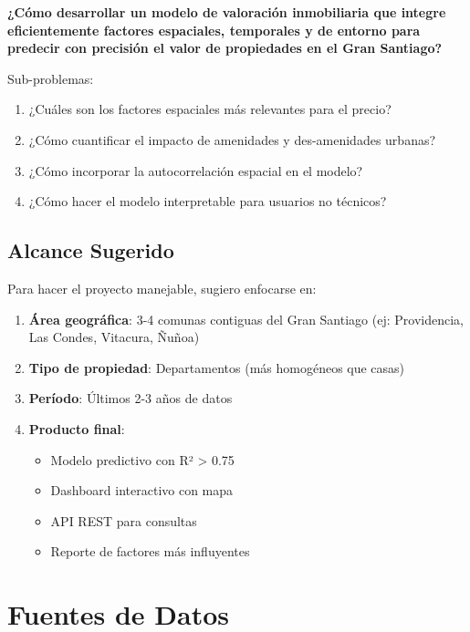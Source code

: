 \documentclass[11pt,a4paper]{article}
\begin{document}
\begin{tcolorbox}[colframe=usachred,colback=red!5,title=Problemática Central]
\textbf{¿Cómo desarrollar un modelo de valoración inmobiliaria que integre eficientemente factores espaciales, temporales y de entorno para predecir con precisión el valor de propiedades en el Gran Santiago?}

Sub-problemas:
\begin{enumerate}
    \item ¿Cuáles son los factores espaciales más relevantes para el precio?
    \item ¿Cómo cuantificar el impacto de amenidades y des-amenidades urbanas?
    \item ¿Cómo incorporar la autocorrelación espacial en el modelo?
    \item ¿Cómo hacer el modelo interpretable para usuarios no técnicos?
\end{enumerate}
\end{tcolorbox}

\subsection{Alcance Sugerido}

Para hacer el proyecto manejable, sugiero enfocarse en:

\begin{enumerate}
    \item \textbf{Área geográfica}: 3-4 comunas contiguas del Gran Santiago (ej: Providencia, Las Condes, Vitacura, Ñuñoa)
    \item \textbf{Tipo de propiedad}: Departamentos (más homogéneos que casas)
    \item \textbf{Período}: Últimos 2-3 años de datos
    \item \textbf{Producto final}: 
    \begin{itemize}
        \item Modelo predictivo con R² > 0.75
        \item Dashboard interactivo con mapa
        \item API REST para consultas
        \item Reporte de factores más influyentes
    \end{itemize}
\end{enumerate}

\newpage

\section{Fuentes de Datos}
\end{document}
